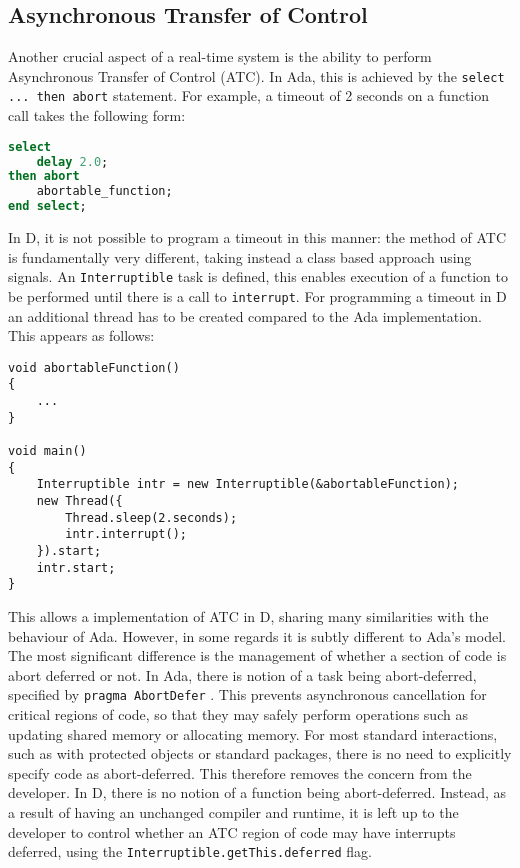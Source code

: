 \subsection{Asynchronous Transfer of Control}
Another crucial aspect of a real-time system is the ability to perform
Asynchronous Transfer of Control (ATC). In Ada, this is achieved by the 
\texttt{select ... then abort} statement. 
For example, a timeout of 2 seconds on a function call takes the 
following form: 
\begin{lstlisting}[basicstyle=\small,language=Ada]
select 
    delay 2.0; 
then abort
    abortable_function; 
end select; 
\end{lstlisting}
In D, it is not possible to program a timeout in this manner: the method of ATC
is fundamentally very different, taking instead a class based approach using 
signals. An \texttt{Interruptible} task is defined, this enables
execution of a function to be performed until there is a call to
\texttt{interrupt}. For programming a timeout in D an additional
thread has to be created compared to the Ada implementation. 
This appears as follows: 
\begin{lstlisting}[basicstyle=\small]
void abortableFunction()
{
    ...
}

void main()
{
    Interruptible intr = new Interruptible(&abortableFunction); 
    new Thread({
        Thread.sleep(2.seconds); 
        intr.interrupt(); 
    }).start;
    intr.start; 
}
\end{lstlisting}
This allows a implementation of ATC in D, sharing many similarities with the
behaviour of Ada. However, in some regards it is subtly different to 
Ada's model. The most significant difference is the management of
whether a section of code is abort deferred or not. In Ada, there is notion of
a task being abort-deferred, specified by \texttt{pragma Abort\textunderscore{}Defer}
\cite{atc-article}.
This prevents asynchronous cancellation for
critical regions of code, so that they may safely perform operations such as
updating shared memory or allocating memory. 
For most standard interactions, such as with protected objects or standard
packages, there is no need to explicitly specify code as abort-deferred. This
therefore removes the concern from the developer. In D, there is no notion of a
function being abort-deferred. Instead, as a result of having an unchanged
compiler and runtime, it is left up to the developer to
control whether an ATC region of code may have interrupts deferred, using the 
\texttt{Interruptible.getThis.deferred} flag. 


